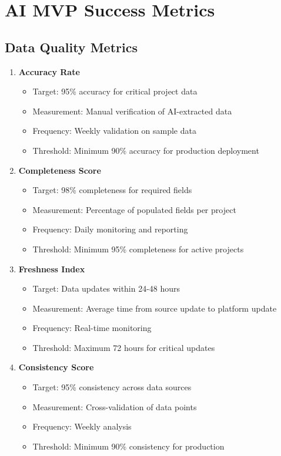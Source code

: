 \documentclass[business]{../templates/infraradar-main}
\begin{document}
\section{AI MVP Success Metrics}

\subsection{Data Quality Metrics}
\begin{enumerate}
    \item \textbf{Accuracy Rate}
    \begin{itemize}
        \item Target: 95\% accuracy for critical project data
        \item Measurement: Manual verification of AI-extracted data
        \item Frequency: Weekly validation on sample data
        \item Threshold: Minimum 90\% accuracy for production deployment
    \end{itemize}
    
    \item \textbf{Completeness Score}
    \begin{itemize}
        \item Target: 98\% completeness for required fields
        \item Measurement: Percentage of populated fields per project
        \item Frequency: Daily monitoring and reporting
        \item Threshold: Minimum 95\% completeness for active projects
    \end{itemize}
    
    \item \textbf{Freshness Index}
    \begin{itemize}
        \item Target: Data updates within 24-48 hours
        \item Measurement: Average time from source update to platform update
        \item Frequency: Real-time monitoring
        \item Threshold: Maximum 72 hours for critical updates
    \end{itemize}
    
    \item \textbf{Consistency Score}
    \begin{itemize}
        \item Target: 95\% consistency across data sources
        \item Measurement: Cross-validation of data points
        \item Frequency: Weekly analysis
        \item Threshold: Minimum 90\% consistency for production
    \end{itemize}
\end{enumerate}
\end{document}
